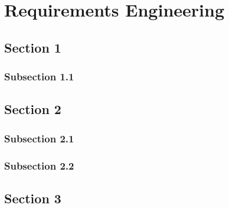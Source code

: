 \chapter{Requirements Engineering}

\section{Section 1}

\subsection{Subsection 1.1}

\section{Section 2}

\subsection{Subsection 2.1}

\subsection{Subsection 2.2}

\section{Section 3}